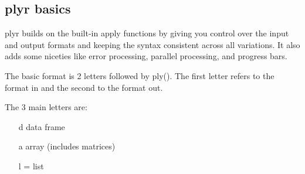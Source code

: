 

\subsection{plyr basics}
plyr builds on the built-in apply functions by giving you control over the input and
output formats and keeping the syntax consistent across all variations. It also adds
some niceties like error processing, parallel processing, and progress bars.

The basic format is 2 letters followed by ply(). The ﬁrst letter refers to the format
in and the second to the format out.

The 3 main letters are:
\begin{itemize}
\item[d] data frame
\item[a]array (includes matrices)
\item[l] = list
\end{itemize}

